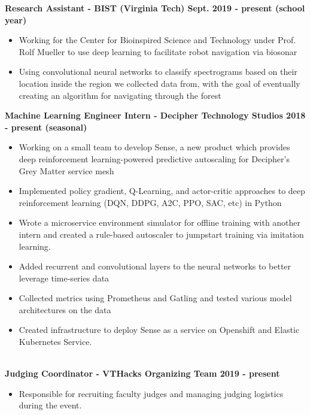 \documentclass{article}
\begin{document}
\begin{center}
\begin{flushleft}
    \textbf{Research Assistant - BIST (Virginia Tech) \hfill Sept. 2019 - present (school year)}
    \begin{itemize}
      \itemsep0em
      \item Working for the Center for Bioinspired Science and Technology under Prof. Rolf Mueller to use deep learning to facilitate robot navigation via biosonar
      \item Using convolutional neural networks to classify spectrograms based on their location inside the region we collected data from, with the goal of eventually creating an algorithm for navigating through the forest 
    \end{itemize}


    \textbf{Machine Learning Engineer Intern - Decipher Technology Studios \hfill 2018 - present (seasonal)}
    \begin{itemize}
      \itemsep0em
      \item Working on a small team to develop Sense, a new product which provides deep reinforcement learning-powered predictive autoscaling for Decipher’s Grey Matter service mesh
      \item Implemented policy gradient, Q-Learning, and actor-critic approaches to deep reinforcement learning (DQN, DDPG, A2C, PPO, SAC, etc) in Python
      \item Wrote a microservice environment simulator for offline training with another intern and created a rule-based autoscaler to jumpstart training via imitation learning.
      \item Added recurrent and convolutional layers to the neural networks to better leverage time-series data
      \item Collected metrics using Prometheus and Gatling and tested various model architectures on the data
      \item Created infrastructure to deploy Sense as a service on Openshift and Elastic Kubernetes Service.
    \end{itemize}


    {\large\textbf{\underline{}}} \\

    \textbf{Judging Coordinator - VTHacks Organizing Team \hfill 2019 - present}
    \begin{itemize}
      \itemsep0em
      \item Responsible for recruiting faculty judges and managing judging logistics during the event.
    \end{itemize}
    

\end{flushleft}
\end{center}
\end{document}
